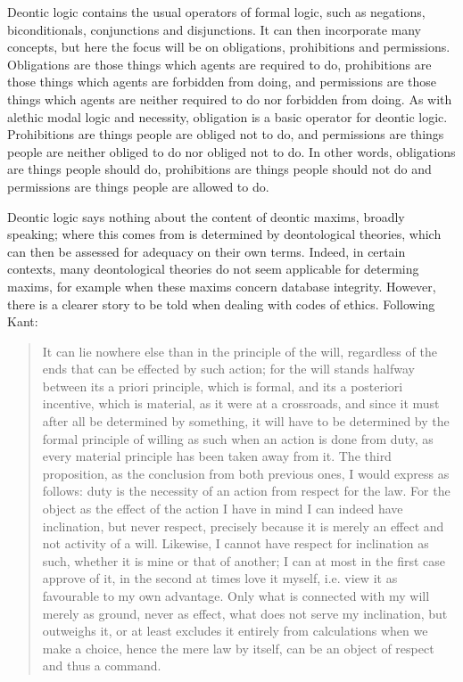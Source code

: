 \documentclass{l4proj}
\begin{document}
Deontic logic contains the usual operators of formal logic, such as negations, biconditionals, conjunctions and disjunctions. It can then incorporate many concepts, but here the focus will be on obligations, prohibitions and permissions. Obligations are those things which agents are required to do, prohibitions are those things which agents are forbidden from doing, and permissions are those things which agents are neither required to do nor forbidden from doing. As with alethic modal logic and necessity, obligation is a basic operator for deontic logic. Prohibitions are things people are obliged not to do, and permissions are things people are neither obliged to do nor obliged not to do. In other words, obligations are things people should do, prohibitions are things people should not do and permissions are things people are allowed to do. 

Deontic logic says nothing about the content of deontic maxims, broadly speaking; where this comes from is determined by deontological theories, which can then be assessed for adequacy on their own terms. Indeed, in certain contexts, many deontological theories do not seem applicable for determing maxims, for example when these maxims concern database integrity. However, there is a clearer story to be told when dealing with codes of ethics. Following Kant\cite{groundwork}: 

\blockquote{It can lie nowhere else than in the principle of the will, regardless of the ends that can be effected by such action; for the will stands halfway between its a priori principle, which is formal, and its a posteriori incentive, which is material, as it were at a crossroads, and since it must after all be determined by something, it will have to be determined by the formal principle of willing as such when an action is done from duty, as every material principle has been taken away from it. The third proposition, as the conclusion from both previous ones, I would express as follows: duty is the necessity of an action from respect for the law. For the object as the effect of the action I have in mind I can indeed have inclination, but never respect, precisely because it is merely an effect and not activity of a will. Likewise, I cannot have respect for inclination as such, whether it is mine or that of another; I can at most in the first case approve of it, in the second at times love it myself, i.e. view it as favourable to my own advantage. Only what is connected with my will merely as ground, never as effect, what does not serve my inclination, but outweighs it, or at least excludes it entirely from calculations when we make a choice, hence the mere law by itself, can be an object of respect and thus a command.}
\end{document}

